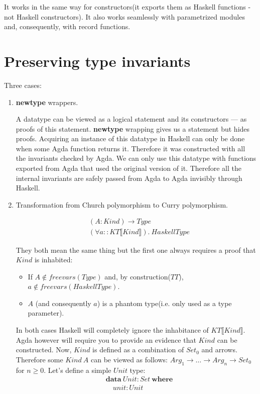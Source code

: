 It works in the same way for constructors(it exports them as Haskell functions - not Haskell constructors).
It also works seamlessly with parametrized modules and, consequently, with record functions.

\section{Preserving type invariants}

Three cases:
\begin{enumerate}
\item \textbf{newtype} wrappers.

A datatype can be viewed as a logical statement and its constructors --- as
proofs of this statement. \textbf{newtype} wrapping gives us a statement but
hides proofs. Acquiring an instance of this datatype in Haskell can only be done
when some Agda function returns it. Therefore it was constructed with all the invariants
checked by Agda. We can only use this datatype with functions exported from Agda that
used the original version of it. Therefore all the internal invariants are safely passed
from Agda to Agda invisibly through Haskell.

\item Transformation from Church polymorphism to Curry polymorphism.

\begin{align*}
&(A : Kind) \rightarrow Type \\
&(\forall a :: KT\llbracket Kind \rrbracket).\ HaskellType
\end{align*}

They both mean the same thing but the first one always requires a proof that
\(Kind\) is inhabited:

\begin{itemize}
\item If \(A \not\in freevars(Type)\) and, by construction(\(TT\)), \(a \not\in freevars(HaskellType)\).
\item \(A\) (and consequently \(a\)) is a phantom type(i.e. only used as a type parameter).
\end{itemize}

In both cases Haskell will completely ignore the inhabitance of \(KT\llbracket Kind \rrbracket\).
Agda however will require you to provide an evidence that \(Kind\) can be constructed. Now,
\(Kind\) is defined as a combination of \(Set_0\) and arrows. Therefore some \(Kind\ A\) can be viewed as
follows: \(Arg_1 \rightarrow \ldots \rightarrow Arg_n \rightarrow Set_0\) for \(n \ge 0\).
Let's define a simple \(Unit\) type:
\begin{align*}
   &\mathbf{data}\ Unit : Set\ \mathbf{where}\\
   &\quad unit : Unit
\end{align*}


\end{enumerate}

